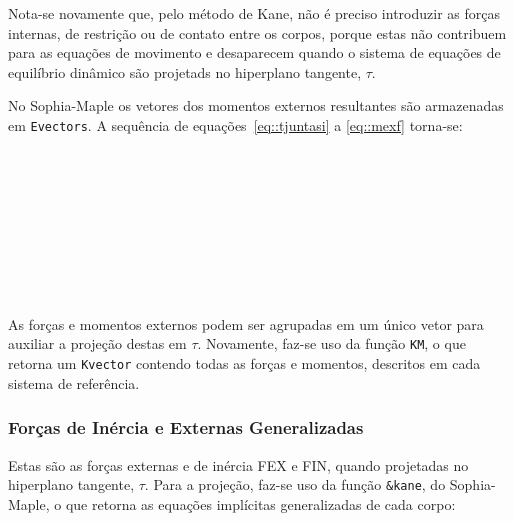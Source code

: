 Nota-se novamente que, pelo método de Kane, não é preciso introduzir as forças
internas, de restrição ou de contato entre os corpos, porque estas não
contribuem para as equações de movimento e desaparecem quando o sistema de
equações de equilíbrio dinâmico são projetads no hiperplano tangente, $\tau$.

No Sophia-Maple os vetores dos momentos externos resultantes são armazenadas em
\texttt{Evectors}. A sequência de equações~\ref{eq::tjuntasi} a \ref{eq::mexf}
torna-se:

\medskip {} \\
		  \\
		  \\
		  \\
		  \\

\medskip {} \\
		  \\
		  \medskip

		 
As forças e momentos externos podem ser agrupadas em um único vetor para
auxiliar a projeção destas em $\tau$. Novamente, faz-se uso da função
\texttt{KM}, o que retorna um \texttt{Kvector} contendo todas as forças e
momentos, descritos em cada sistema de referência.

\medskip {}

		 
\subsubsection{Forças de Inércia e Externas Generalizadas}

Estas são as forças externas e de inércia FEX e FIN, quando projetadas no
hiperplano tangente, $\tau$. Para a projeção, faz-se uso da função
\texttt{\&kane}, do Sophia-Maple, o que retorna as equações implícitas
generalizadas de cada corpo:

\medskip {} \\
		 
